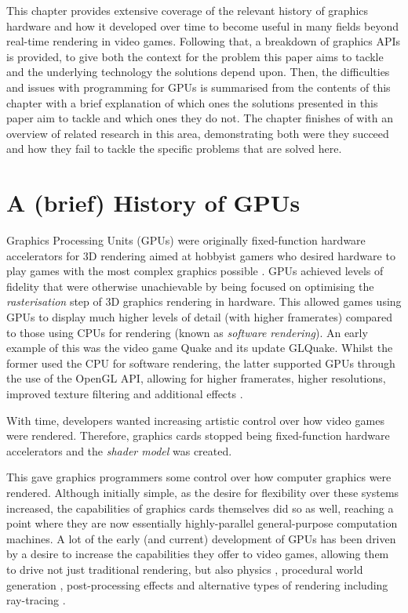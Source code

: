 \documentclass[a4paper,12pt,twoside,openright]{report}
\begin{document}
This chapter provides extensive coverage of the relevant history of graphics
hardware and how it developed over time to become useful in many fields beyond
real-time rendering in video games. Following that, a breakdown of graphics
APIs is provided, to give both the context for the problem this paper aims to
tackle and the underlying technology the solutions depend upon. Then, the
difficulties and issues with programming for GPUs is summarised from the
contents of this chapter with a brief explanation of which ones the solutions
presented in this paper aim to tackle and which ones they do not. The chapter
finishes of with an overview of related research in this area, demonstrating
both were they succeed and how they fail to tackle the specific problems that
are solved here.

\section{A (brief) History of GPUs}

\label{sec:history_gpu}

Graphics Processing Units (GPUs) were originally fixed-function hardware
accelerators for 3D rendering aimed at hobbyist gamers who desired hardware to
play games with the most complex graphics possible \cite{TODO}. GPUs achieved
levels of fidelity that were otherwise unachievable by being focused on
optimising the \textit{rasterisation} step of 3D graphics rendering in
hardware. This allowed games using GPUs to display much higher levels of detail
(with higher framerates) compared to those using CPUs for rendering (known as
\textit{software rendering}). An early example of this was the video game Quake
and its update GLQuake. Whilst the former used the CPU for software rendering,
the latter supported GPUs through the use of the OpenGL API, allowing for
higher framerates, higher resolutions, improved texture filtering and
additional effects \cite{GLQuake}.

With time, developers wanted increasing artistic control over how video games
were rendered. Therefore, graphics cards stopped being fixed-function hardware
accelerators and the \textit{shader model} was created.

This gave graphics programmers some control over how computer graphics were
rendered. Although initially simple, as the desire for flexibility over these
systems increased, the capabilities of graphics cards themselves did so as
well, reaching a point where they are now essentially highly-parallel
general-purpose computation machines. A lot of the early (and current)
development of GPUs has been driven by a desire to increase the capabilities
they offer to video games, allowing them to drive not just traditional
rendering, but also physics \cite{TODO}, procedural world generation
\cite{TODO}, post-processing effects \cite{TODO} and alternative types of
rendering including ray-tracing \cite{TODO}.
\end{document}
